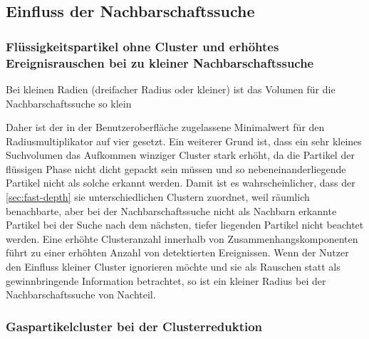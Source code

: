 \subsection{Einfluss der Nachbarschaftssuche}\label{sec:eva:nachbarschaftssuche}

\subsubsection{Flüssigkeitspartikel ohne Cluster und erhöhtes Ereignisrauschen bei zu kleiner Nachbarschaftssuche}

Bei kleinen Radien (dreifacher Radius oder kleiner) ist das Volumen für die Nachbarschaftssuche so klein %

Daher ist der in der Benutzeroberfläche zugelassene Minimalwert für den Radiusmultiplikator auf vier gesetzt. Ein weiterer Grund ist, dass ein sehr kleines Suchvolumen das Aufkommen winziger Cluster stark erhöht, da die Partikel der flüssigen Phase nicht dicht gepackt sein müssen und so nebeneinanderliegende Partikel nicht als solche erkannt werden. %
Damit ist es wahrscheinlicher, dass der  \autoref{sec:fast-depth} sie unterschiedlichen Clustern zuordnet, weil räumlich benachbarte, aber bei der Nachbarschaftssuche nicht als Nachbarn erkannte Partikel bei der Suche nach dem nächsten, tiefer liegenden Partikel nicht beachtet werden. Eine erhöhte Clusteranzahl innerhalb von Zusammenhangskomponenten führt zu einer erhöhten Anzahl von detektierten Ereignissen. Wenn der Nutzer den Einfluss kleiner Cluster ignorieren möchte und sie als Rauschen statt als gewinnbringende Information betrachtet, so ist ein kleiner Radius bei der Nachbarschaftssuche von Nachteil. %

\subsubsection*{Gaspartikelcluster bei der Clusterreduktion}  %

